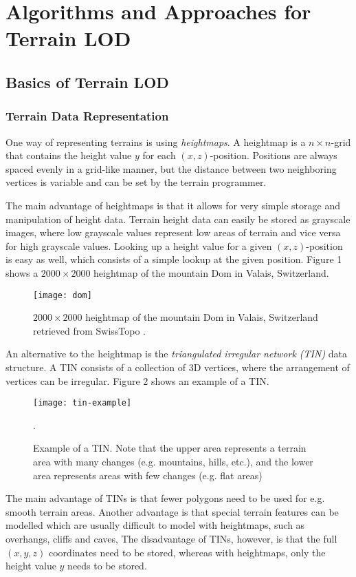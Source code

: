 \chapter{Algorithms and Approaches for Terrain LOD}
\section{Basics of Terrain LOD}
\subsection{Terrain Data Representation}
One way of representing terrains is using \textit{heightmaps}.
A heightmap is a $n\times n$-grid that contains 
the height value $y$ for each $(x,z)$-position.
Positions are always spaced evenly in a grid-like manner,
but the distance between two neighboring vertices is variable
and can be set by the terrain programmer.

The main advantage of heightmaps is that it allows for very simple storage and manipulation of height data.
Terrain height data can easily be stored as grayscale images,
where low grayscale values represent low areas of terrain and vice versa for
high grayscale values. Looking up a height value for a given $(x,z)$-position is easy as well,
which consists of a simple lookup at the given position.
Figure 1 shows a $2000 \times 2000$ heightmap of the mountain Dom in Valais, Switzerland.
\begin{figure}
  \centering
  \texttt{[image: dom]}
  \caption{$2000 \times 2000$ heightmap of the mountain Dom in Valais, Switzerland retrieved from SwissTopo \cite{alti3d}.}
\end{figure}

An alternative to the heightmap is the \textit{triangulated irregular network (TIN)} data structure.
A TIN consists of a collection of 3D vertices, where 
the arrangement of vertices can be irregular. Figure 2 shows 
an example of a TIN.
\begin{figure}
  \centering
  \texttt{[image: tin-example]}
  \caption{Example of a TIN. Note that the upper area represents a terrain area with many changes 
  (e.g. mountains, hills, etc.), and the lower area represents areas with few changes (e.g. flat areas)}.
\end{figure}


The main advantage of TINs is that fewer polygons need to be used for 
e.g. smooth terrain areas. Another advantage is that
special terrain features can be modelled 
which are usually difficult to model with heightmaps, such as overhangs, cliffs and caves, 
The disadvantage of TINs, however, is that the full $(x,y,z)$ coordinates need to be stored,
whereas with heightmaps, only the height value $y$ needs to be stored.

